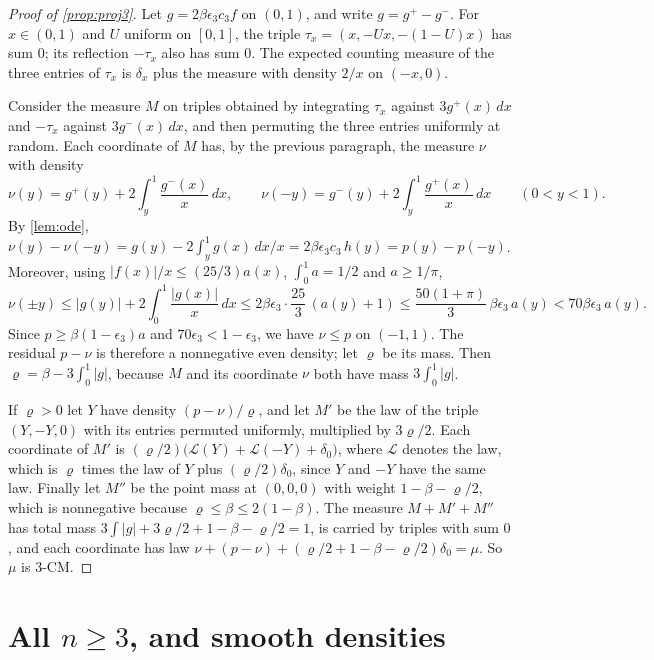 \documentclass[11pt]{article}
\theoremstyle{definition}
\theoremstyle{remark}
\begin{document}
\begin{proof}[Proof of \cref{prop:proj3}]
Let $g=2\beta\epsilon_3 c_3 f$ on $(0,1)$, and write $g=g^+-g^-$. For $x\in(0,1)$ and $U$ uniform on $[0,1]$, the
triple $\tau_x=(x,-Ux,-(1-U)x)$ has sum $0$; its reflection $-\tau_x$ also has sum $0$. The expected counting
measure of the three entries of $\tau_x$ is $\delta_x$ plus the measure with density $2/x$ on $(-x,0)$.

Consider the measure $M$ on triples obtained by integrating $\tau_x$ against $3g^+(x)\,dx$ and $-\tau_x$ against
$3g^-(x)\,dx$, and then permuting the three entries uniformly at random. Each coordinate of $M$ has, by the previous
paragraph, the measure $\nu$ with density
\[
\nu(y)=g^+(y)+2\int_y^1\frac{g^-(x)}{x}\,dx,\qquad \nu(-y)=g^-(y)+2\int_y^1\frac{g^+(x)}{x}\,dx\qquad(0<y<1).
\]
By \cref{lem:ode}, $\nu(y)-\nu(-y)=g(y)-2\int_y^1g(x)\,dx/x=2\beta\epsilon_3 c_3\,h(y)=p(y)-p(-y)$. Moreover, using
$|f(x)|/x\le(25/3)a(x)$, $\int_0^1a=1/2$ and $a\ge1/\pi$,
\[
\nu(\pm y)\le|g(y)|+2\int_0^1\frac{|g(x)|}{x}\,dx\le2\beta\epsilon_3\cdot\frac{25}{3}\,(a(y)+1)
\le\frac{50(1+\pi)}{3}\,\beta\epsilon_3\,a(y)<70\beta\epsilon_3\,a(y).
\]
Since $p\ge\beta(1-\epsilon_3)a$ and $70\epsilon_3<1-\epsilon_3$, we have $\nu\le p$ on $(-1,1)$. The residual $p-\nu$ is
therefore a nonnegative even density; let $\varrho$ be its mass. Then $\varrho=\beta-3\int_0^1|g|$, because $M$ and its coordinate $\nu$ both have mass $3\int_0^1|g|$.

If $\varrho>0$ let $Y$ have density $(p-\nu)/\varrho$, and let $M'$ be the law of the triple $(Y,-Y,0)$ with its entries
permuted uniformly, multiplied by $3\varrho/2$. Each coordinate of $M'$ is $(\varrho/2)\bigl(\mathcal L(Y)+\mathcal L(-Y)+\delta_0\bigr)$, where $\mathcal L$ denotes the law, which is $\varrho$ times the law
of $Y$ plus $(\varrho/2)\delta_0$, since $Y$ and $-Y$ have the same law. Finally let $M''$ be the point mass at $(0,0,0)$ with weight $1-\beta-\varrho/2$, which is
nonnegative because $\varrho\le\beta\le 2(1-\beta)$. The measure $M+M'+M''$ has total mass
$3\int|g|+3\varrho/2+1-\beta-\varrho/2=1$, is carried by triples with sum $0$, and each coordinate has law
$\nu+(p-\nu)+(\varrho/2+1-\beta-\varrho/2)\delta_0=\mu$. So $\mu$ is $3$-CM.
\end{proof}

\section{All \texorpdfstring{$n\ge3$}{n >= 3}, and smooth densities}\label{sec:all}
\end{document}
